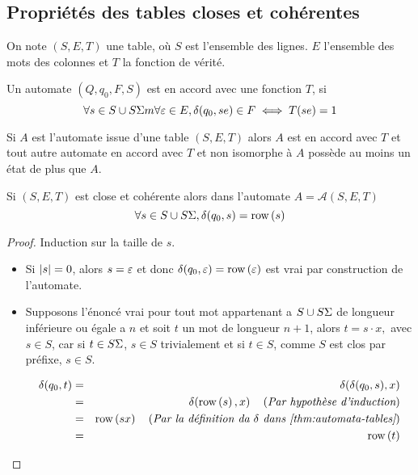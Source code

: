 \subsection{Propriétés des tables closes et cohérentes}

\begin{notation}
	On note $(S,E,T)$ une table, où $S$ est l'ensemble des lignes. $E$ l'ensemble des mots des colonnes et $T$ la fonction de vérité.
\end{notation}

\begin{definition}
	Un automate $(Q, q_0, F, S)$ est en accord avec une fonction $T$, si
	$$ \forall s \in S \cup S\Sigma m \forall \varepsilon \in E, \delta(q_0,se) \in F \iff T(se) = 1$$
\end{definition}

\begin{theorem}
	Si $A$ est l'automate issue d'une table $(S,E,T)$ alors $A$ est en accord avec $T$ et tout autre
	automate en accord avec $T$ et non isomorphe à $A$ possède au moins un état de plus que $A$.
\end{theorem}

\begin{lemma} \label{lem:learning-9}
	Si $(S,E,T)$ est close et cohérente alors dans l'automate $A = \mathcal A (S,E,T)$
	$$\forall s \in S \cup S\Sigma, \delta(q_0,s) = \text{row}\left(s\right)$$
\end{lemma}

\begin{proof}
	Induction sur la taille de $s$.
	\begin{itemize}
		\item Si $|s| = 0$, alors $s = \varepsilon$ et donc $\delta(q_0, \varepsilon) = \text{row}\left(\varepsilon\right)$
		      est vrai par construction de l'automate.
		\item Supposons l'énoncé vrai pour tout mot appartenant a $S \cup S\Sigma$ de longueur inférieure ou égale a $n$ et
		      soit $t$ un mot de longueur $n +1$, alors $ t  = s \cdot x,$ avec $s \in S$, car
		      si $t \in S\Sigma$, $s \in S$ trivialement et si $t \in S$, comme $S$ est clos par préfixe, $s \in S$.

		      \begin{eqnarray*}
			      \delta(q_0, t) &=& \delta(\delta(q_0, s), x) \\
			      &=& \delta(\text{row}\left(s\right), x)  \quad\left(\textit{Par hypothèse d'induction}\right) \\
			      &=& \text{row}\left(sx\right)  \quad\left(\textit{Par la définition da $\delta$ dans \ref{thm:automata-tables}}\right) \\
			      &=& \text{row}\left(t\right)
		      \end{eqnarray*}
	\end{itemize}
\end{proof}


